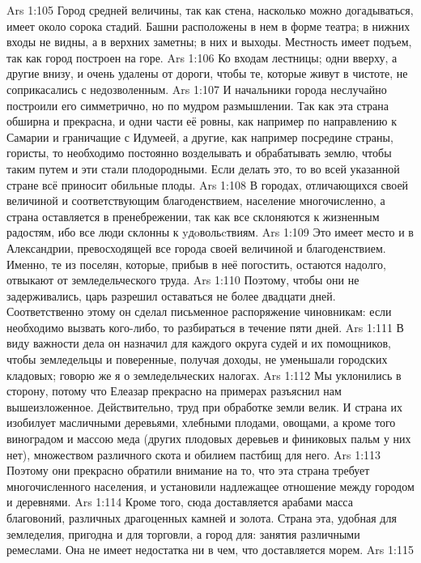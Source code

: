 \vs Ars 1:105
Город средней величины, так как стена, насколько можно догадываться, имеет около сорока стадий. Башни расположены в нем в форме театра; в нижних входы не видны, а в верхних заметны; в них и выходы. Местность имеет подъем, так как город построен на горе.
\vs Ars 1:106
Ко входам лестницы; одни вверху, а другие внизу, и очень удалены от дороги, чтобы те, которые живут в чистоте, не соприкасались с недозволенным.
\vs Ars 1:107
И начальники города неслучайно построили его симметрично, но по мудром размышлении. Так как эта страна обширна и прекрасна, и одни части её ровны, как например по направлению к Самарии и граничащие с Идумеей, а другие, как например посредине страны, гористы, то необходимо постоянно возделывать и обрабатывать землю, чтобы таким путем и эти стали плодородными. Если делать это, то во всей указанной стране всё приносит обильные плоды.
\vs Ars 1:108
В городах, отличающихся своей величиной и соответствующим благоденствием, население многочисленно, а страна оставляется в пренебрежении, так как все склоняются к жизненным радостям, ибо все люди склонны к yдoвольcтвиям.
\vs Ars 1:109
Это имеет место и в Александрии, превосходящей все города своей величиной и благоденствием. Именно, те из поселян, которые, прибыв в неё погостить, остаются надолго, отвыкают от земледельческого труда.
\vs Ars 1:110
Поэтому, чтобы они не задерживались, царь разрешил оставаться не более двадцати дней. Соответственно этому он сделал письменное распоряжение чиновникам: если необходимо вызвать кого-либо, то разбираться в течение пяти дней.
\vs Ars 1:111
В виду важности дела он назначил для каждого округа судей и их помощников, чтобы земледельцы и поверенные, получая доходы, не уменьшали городских кладовых; говорю же я о земледельческих налогах.
\vs Ars 1:112
Мы уклонились в сторону, потому что Елеазар прекрасно на примерах разъяснил нам вышеизложенное. Действительно, труд при обработке земли велик. И страна их изобилует масличными деревьями, хлебными плодами, овощами, а кроме того виноградом и массою меда (других плодовых деревьев и финиковых пальм у них нет), множеством различного скота и обилием пастбищ для него.
\vs Ars 1:113
Поэтому они прекрасно обратили внимание на то, что эта страна требует многочисленного населения, и установили надлежащее отношение между городом и деревнями.
\vs Ars 1:114
Кроме того, сюда доставляется арабами масса благовоний, различных драгоценных камней и золота. Страна эта, удобная для земледелия, пригодна и для торговли, а город для: занятия различными ремеслами. Она не имеет недостатка ни в чем, что доставляется морем.
\vs Ars 1:115
